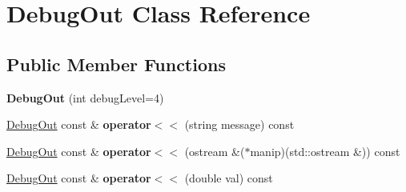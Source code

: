 \hypertarget{classDebugOut}{\section{Debug\-Out Class Reference}
\label{classDebugOut}
}
\subsection*{Public Member Functions}
\begin{DoxyCompactItemize}
\item 
\hypertarget{classDebugOut_a833f5ea5ab0d98d3fdf4a1ed8efed770}{{\bfseries Debug\-Out} (int debug\-Level=4)}\label{classDebugOut_a833f5ea5ab0d98d3fdf4a1ed8efed770}

\item 
\hypertarget{classDebugOut_a947d941f603caf3ca6b39268b55344de}{\hyperlink{classDebugOut}{Debug\-Out} const \& {\bfseries operator$<$$<$} (string message) const }\label{classDebugOut_a947d941f603caf3ca6b39268b55344de}

\item 
\hypertarget{classDebugOut_a0b83635c229210d6000b9663575bbe99}{\hyperlink{classDebugOut}{Debug\-Out} const \& {\bfseries operator$<$$<$} (ostream \&($\ast$manip)(std\-::ostream \&)) const }\label{classDebugOut_a0b83635c229210d6000b9663575bbe99}

\item 
\hypertarget{classDebugOut_a9ab6e54c6f70bcbf18faf329952b5998}{\hyperlink{classDebugOut}{Debug\-Out} const \& {\bfseries operator$<$$<$} (double val) const }\label{classDebugOut_a9ab6e54c6f70bcbf18faf329952b5998}

\end{DoxyCompactItemize}
